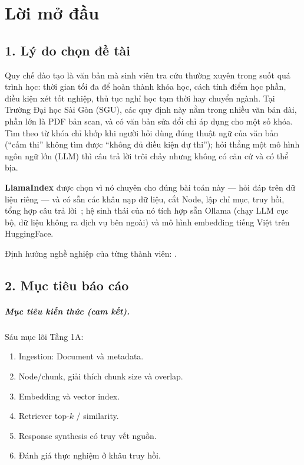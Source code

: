 \chapter*{Lời mở đầu}
\label{ch:loi-mo-dau}

\section*{1. Lý do chọn đề tài}

Quy chế đào tạo là văn bản mà sinh viên tra cứu thường xuyên trong suốt quá trình học: thời gian tối đa
để hoàn thành khóa học, cách tính điểm học phần, điều kiện xét tốt nghiệp, thủ tục nghỉ học tạm thời hay
chuyển ngành. Tại Trường Đại học Sài Gòn (SGU), các quy định này nằm trong nhiều văn bản dài, phần lớn là
PDF bản scan, và có văn bản sửa đổi chỉ áp dụng cho một số khóa. Tìm theo từ khóa chỉ khớp khi người hỏi
dùng đúng thuật ngữ của văn bản (``cấm thi'' không tìm được ``không đủ điều kiện dự thi''); hỏi thẳng một
mô hình ngôn ngữ lớn (LLM) thì câu trả lời trôi chảy nhưng không có căn cứ và có thể bịa.

\textbf{LlamaIndex} được chọn vì nó chuyên cho đúng bài toán này --- hỏi đáp trên dữ liệu riêng --- và có
sẵn các khâu nạp dữ liệu, cắt Node, lập chỉ mục, truy hồi, tổng hợp câu trả lời~\cite{llamaindex2025docs};
hệ sinh thái của nó tích hợp sẵn Ollama (chạy LLM cục bộ, dữ liệu không ra dịch vụ bên ngoài) và mô hình
embedding tiếng Việt trên HuggingFace.

Định hướng nghề nghiệp của từng thành viên: .

\section*{2. Mục tiêu báo cáo}

\paragraph{Mục tiêu kiến thức (cam kết).} Sáu mục lõi Tầng 1A:
\begin{enumerate}
  \item Ingestion: Document và metadata.
  \item Node/chunk, giải thích chunk size và overlap.
  \item Embedding và vector index.
  \item Retriever top-$k$ / similarity.
  \item Response synthesis có truy vết nguồn.
  \item Đánh giá thực nghiệm ở khâu truy hồi.
\end{enumerate}

